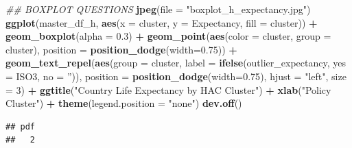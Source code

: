\documentclass[]{article}
\newenvironment{Shaded}{\begin{snugshade}}{\end{snugshade}}
\newcommand{\CommentTok}[1]{\textcolor[rgb]{0.56,0.35,0.01}{\textit{#1}}}
\newcommand{\DataTypeTok}[1]{\textcolor[rgb]{0.13,0.29,0.53}{#1}}
\newcommand{\DecValTok}[1]{\textcolor[rgb]{0.00,0.00,0.81}{#1}}
\newcommand{\FloatTok}[1]{\textcolor[rgb]{0.00,0.00,0.81}{#1}}
\newcommand{\KeywordTok}[1]{\textcolor[rgb]{0.13,0.29,0.53}{\textbf{#1}}}
\newcommand{\NormalTok}[1]{#1}
\newcommand{\OperatorTok}[1]{\textcolor[rgb]{0.81,0.36,0.00}{\textbf{#1}}}
\newcommand{\StringTok}[1]{\textcolor[rgb]{0.31,0.60,0.02}{#1}}
\begin{document}
\begin{Shaded}
\begin{Highlighting}[]
\CommentTok{## BOXPLOT QUESTIONS}
\KeywordTok{jpeg}\NormalTok{(}\DataTypeTok{file =} \StringTok{"boxplot_h_expectancy.jpg"}\NormalTok{)}
\KeywordTok{ggplot}\NormalTok{(master_df_h, }
       \KeywordTok{aes}\NormalTok{(}\DataTypeTok{x =}\NormalTok{ cluster, }\DataTypeTok{y =}\NormalTok{ Expectancy, }\DataTypeTok{fill =}\NormalTok{ cluster)) }\OperatorTok{+}
\StringTok{  }\KeywordTok{geom_boxplot}\NormalTok{(}\DataTypeTok{alpha =} \FloatTok{0.3}\NormalTok{) }\OperatorTok{+}
\StringTok{  }\KeywordTok{geom_point}\NormalTok{(}\KeywordTok{aes}\NormalTok{(}\DataTypeTok{color =}\NormalTok{ cluster, }\DataTypeTok{group =}\NormalTok{ cluster), }\DataTypeTok{position =} \KeywordTok{position_dodge}\NormalTok{(}\DataTypeTok{width=}\FloatTok{0.75}\NormalTok{)) }\OperatorTok{+}
\StringTok{  }\KeywordTok{geom_text_repel}\NormalTok{(}\KeywordTok{aes}\NormalTok{(}\DataTypeTok{group =}\NormalTok{ cluster, }
                \DataTypeTok{label =} \KeywordTok{ifelse}\NormalTok{(outlier_expectancy, }
                  \DataTypeTok{yes =}\NormalTok{ ISO3,}
                  \DataTypeTok{no =} \StringTok{''}\NormalTok{)), }
            \DataTypeTok{position =} \KeywordTok{position_dodge}\NormalTok{(}\DataTypeTok{width=}\FloatTok{0.75}\NormalTok{),}
            \DataTypeTok{hjust =} \StringTok{"left"}\NormalTok{, }\DataTypeTok{size =} \DecValTok{3}\NormalTok{) }\OperatorTok{+}\StringTok{ }\KeywordTok{ggtitle}\NormalTok{(}\StringTok{"Country Life Expectancy by HAC Cluster"}\NormalTok{) }\OperatorTok{+}\StringTok{ }\KeywordTok{xlab}\NormalTok{(}\StringTok{"Policy Cluster"}\NormalTok{) }\OperatorTok{+}\StringTok{ }
\StringTok{  }\KeywordTok{theme}\NormalTok{(}\DataTypeTok{legend.position =} \StringTok{"none"}\NormalTok{)}
\KeywordTok{dev.off}\NormalTok{()}
\end{Highlighting}
\end{Shaded}

\begin{verbatim}
## pdf 
##   2
\end{verbatim}

\begin{Shaded}
\end{Shaded}
\end{document}
